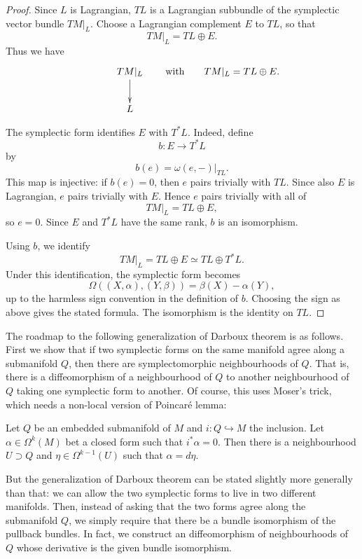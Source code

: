 \begin{proof}
Since $L$ is Lagrangian, $TL$ is a
Lagrangian subbundle of the symplectic
vector bundle $TM|_L$. Choose a Lagrangian
complement $E$ to $TL$, so that
$$
TM|_L=TL\oplus E.
$$
Thus we have
$$
\xymatrix{
& TM|_L \ar[d]\\
& L
}
\qquad\text{with}\qquad
TM|_L=TL\oplus E.
$$

\medskip\noindent
The symplectic form identifies $E$ with
$T^*L$. Indeed, define
$$
b:E\longrightarrow T^*L
$$
by
$$
b(e)=\omega(e,-)|_{TL}.
$$
This map is injective: if $b(e)=0$, then
$e$ pairs trivially with $TL$. Since also
$E$ is Lagrangian, $e$ pairs trivially with
$E$. Hence $e$ pairs trivially with all of
$$
TM|_L=TL\oplus E,
$$
so $e=0$. Since $E$ and $T^*L$ have the
same rank, $b$ is an isomorphism.

\medskip\noindent
Using $b$, we identify
$$
TM|_L=TL\oplus E
\simeq
TL\oplus T^*L.
$$
Under this identification, the symplectic
form becomes
$$
\Omega((X,\alpha),(Y,\beta))
=
\beta(X)-\alpha(Y),
$$
up to the harmless sign convention in the
definition of $b$. Choosing the sign as
above gives the stated formula. The
isomorphism is the identity on $TL$.
\end{proof}

\noindent
The roadmap to the following generalization
of Darboux theorem is as follows.
First we show that if two symplectic
forms on the same manifold agree
along a submanifold $Q$,
then there are symplectomorphic
neighbourhoods of $Q$. That is,
there is a diffeomorphism
of a neighbourhood of $Q$ to another
neighbourhood of $Q$ taking one symplectic
form to another. Of course, this uses
Moser's trick, which needs a non-local
version of Poincaré lemma:

\begin{lemma}
\label{lemma-relative-poincare}
Let $Q$ be an embedded submanifold of $M$
and $i:Q \hookrightarrow M$ the inclusion.
Let $\alpha \in \Omega^k(M)$ bet a closed
form such that $i^*\alpha=0$.
Then there is a neighbourhood
$U \supset Q$ and $\eta \in \Omega^{k-1}(U)$
such that $\alpha=d \eta$.
\end{lemma}

But the generalization of Darboux theorem
can be stated slightly more generally than 
that: we can allow the two symplectic 
forms to live in two different manifolds.
Then, instead of asking that the two
forms agree along the submanifold $Q$,
we simply require that there be
a bundle isomorphism of the pullback
bundles. In fact, we construct
an diffeomorphism of neighbourhoods
of $Q$ whose derivative is the given
bundle isomorphism.

